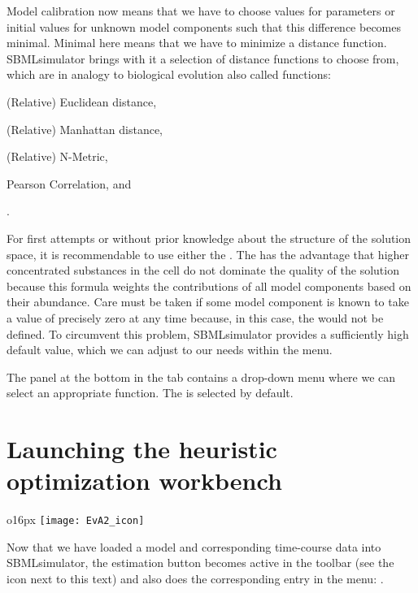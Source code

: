 Model calibration now means that we have to choose values for parameters or initial values for unknown model components such that this difference becomes minimal.
Minimal here means that we have to minimize a distance function.
SBMLsimulator brings with it a selection of distance functions to choose from, which are in analogy to biological evolution also called \emph{\fitness} functions:
\begin{enumerate*}[label=(\roman*)]
  \item (Relative) Euclidean distance,
  \item (Relative) Manhattan distance,
  \item (Relative) N-Metric,
  \item Pearson Correlation, and
  \item \RSE.
\end{enumerate*}
For first attempts or without prior knowledge about the structure of the solution space, it is recommendable to use either the \RSE.
The \RSE has the advantage that higher concentrated substances in the cell do not dominate the quality of the solution because this formula weights the contributions of all model components based on their abundance.
Care must be taken if some model component is known to take a value of precisely zero at any time because, in this case, the \RSE would not be defined.
To circumvent this problem, SBMLsimulator provides a sufficiently high default value, which we can adjust to our needs within the  menu.

The panel at the bottom in the  tab contains a drop-down menu where we can select an appropriate \fitness function.
The \RSE is selected by default.


\section{Launching the heuristic optimization workbench \EvA}
\label{sec:LaunchingEvA}

\begin{wrapfigure}{o}{16px}
\vspace{\wrapfigspace}
\texttt{[image: EvA2\_icon]}
\end{wrapfigure}
Now that we have loaded a model and corresponding time-course data into SBMLsimulator, the estimation button becomes active in the toolbar (see the icon next to this text) and also does the corresponding entry in the menu: .

